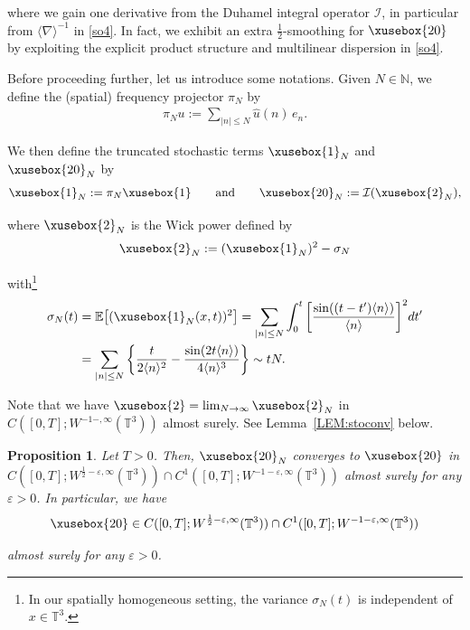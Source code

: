 \documentclass[%
11pt,  reqno]{amsart}
\def\<#1>{\xusebox{#1}}
\newtheorem{proposition}[theorem]{Proposition}
\newcommand{\1}{\hspace{0.2mm}\text{I}\hspace{0.2mm}}
\newcommand{\noi}{\noindent}
\newcommand{\T}{\mathbb{T}}
\newcommand{\E}{\mathbb{E}}
\newcommand{\nb}{\nabla}
\newcommand{\eps}{\varepsilon}
\newcommand{\s}{\sigma}
\newcommand{\ft}{\widehat}
\newcommand{\jb}[1]
{\langle #1 \rangle}
\newcommand{\N}{\mathbb{N}}
\newcommand{\I}{\mathcal{I}}
\numberwithin{equation}{section}
\numberwithin{theorem}{section}
\begin{document}
\noi
where we gain one derivative from the Duhamel integral operator $\I$, 
in particular from $\jb{\nb}^{-1}$ in \eqref{so4}.
In fact, we exhibit  an extra $\frac 12$-smoothing
for $ \<20>$  
by exploiting the explicit product structure
and multilinear dispersion 
 in \eqref{so4}.


Before proceeding further, let us introduce some notations.
Given $N \in \N$, we define the (spatial) frequency projector $\pi_N$  by 
\begin{align}
\pi_N u := 
\sum_{ |n| \leq N}  \ft u (n)  \, e_n.
\label{pi}
\end{align}

\noi
We then define the truncated stochastic terms  $\<1>_N$ 
and   $\<20>_N$ by 
\begin{align}
\<1>_N := \pi_N \<1>
\qquad \text{and}
\qquad 
  \<20>_N := \I (\<2>_N), 
\label{so4a}
\end{align}

\noi
where $\<2>_N$ is the Wick power
defined by 
\begin{align}
\<2>_N   := (\<1>_N)^2 - \s_N
\label{so4b}
\end{align}

\noi
 with\footnote{In our spatially homogeneous setting,
the variance $\s_N(t)$ is independent of $x \in \T^3$.} 
\begin{align}
\begin{split}
\s_N(t) & = \E\big[ (\<1>_N(x, t))^2\big]
=  \sum_{|n|\leq N}
\int_0^t \bigg[\frac{\sin((t - t')\jb{n})}{\jb{n}} \bigg]^2 dt'\\
& = \sum_{|n|\leq N} \bigg\{\frac{t}{2\jb{n}^2} - \frac{\sin(2t \jb{n})}{4\jb{n}^3}\bigg\}
\sim t N.
\end{split}
\label{sigma1}
\end{align}


\noi
Note that we have 
$\<2> = \lim_{N \to \infty} \<2>_N$ in $C([0,T];W^{-1 - ,\infty}(\T^3))$ almost surely.
See Lemma~\ref{LEM:stoconv} below.

\begin{proposition}\label{PROP:sto1}
Let   $T >0$.
Then, 
$ \<20>_N $ converges to 
$\<20>$
in 
$C([0,T];W^{\frac 12 -\eps,\infty}(\T^3)) \cap C^1([0,T];W^{-1 -\eps,\infty}(\T^3))$
almost surely
for any  $\eps > 0$.
 In particular, we have
  \[\<20> \in C([0,T];W^{\frac 12 -\eps,\infty}(\T^3))
  \cap C^1([0,T];W^{-1 -\eps,\infty}(\T^3))\]
  
  \noi
  almost surely for any  $\eps > 0$.
\end{proposition}
\end{document}
